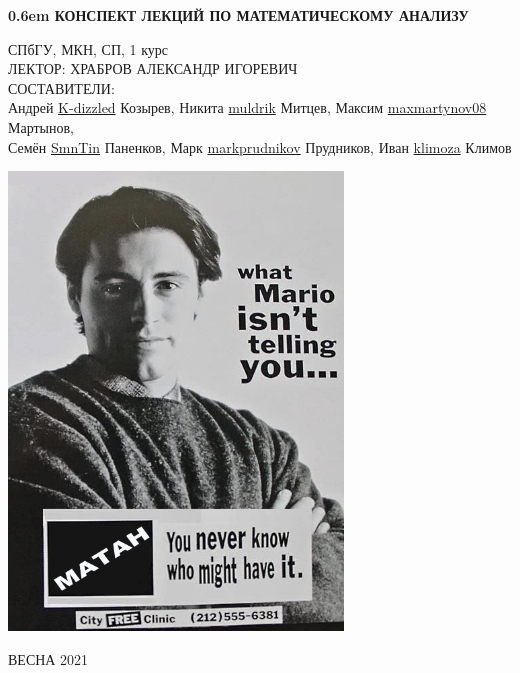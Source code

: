 \documentclass[12pt,letterpaper]{report}
\theoremstyle{definition}
\begin{document}
\clearpage
\newcommand\nbvspace[1][3]{\vspace*{\stretch{#1}}}
\newcommand\nbstretchyspace{\spaceskip0.5em plus 0.25em minus 0.25em}
\newcommand{\nbtitlestretch}{\spaceskip0.6em}
\pagestyle{empty}
\begin{center}
\bfseries
\nbvspace[1]
\Huge
{\nbtitlestretch\huge
КОНСПЕКТ ЛЕКЦИЙ ПО МАТЕМАТИЧЕСКОМУ АНАЛИЗУ}

\nbvspace[1]
\normalsize

СПбГУ, МКН, СП, 1 курс\\
ЛЕКТОР: ХРАБРОВ АЛЕКСАНДР ИГОРЕВИЧ
\nbvspace[1]
\\
\Large СОСТАВИТЕЛИ:\\[0.5em]
\footnotesize
Андрей \href{https://github.com/K-dizzled}{K-dizzled} Козырев,
Никита  \href{https://github.com/muldrik}{muldrik} Митцев,
Максим \href{https://github.com/maxmartynov08}{maxmartynov08} Мартынов,\\
Семён \href{https://github.com/SmnTin}{SmnTin} Паненков,
Марк \href{https://github.com/markprudnikov}{markprudnikov} Прудников,
Иван \href{https://github.com/klimoza}{klimoza} Климов

\nbvspace[2]

\includegraphics[width=3.5in]{./images/matan03.png}
\nbvspace[3]
\normalsize

\large
ВЕСНА 2021
\nbvspace[1]
\end{center}
\end{document}
